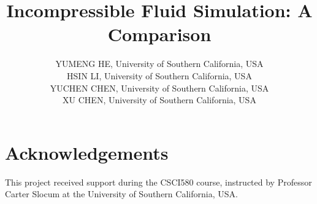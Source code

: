 \documentclass[twocolumn]{NobArticle}
\title{Incompressible Fluid Simulation: A Comparison}
\author{
    YUMENG HE, University of Southern California, USA \\
    HSIN LI, University of Southern California, USA \\
    YUCHEN CHEN, University of Southern California, USA \\
    XU CHEN, University of Southern California, USA
}
\date{}
\begin{document}
\small
\maketitle









\section*{Acknowledgements}
This project received support during the CSCI580 course, instructed by Professor Carter Slocum at the University of Southern California, USA.


\printbibliography
\end{document}
